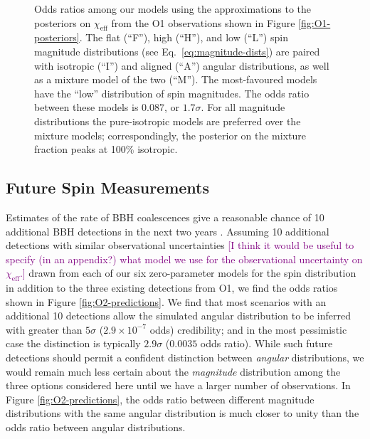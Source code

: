 \documentclass[modern,linenumbers]{aastex61}
\newcommand{\chieff}{\chi_\mathrm{eff}}
\newcommand{\OOneSigmaIsoAligned}{1.7}
\newcommand{\OOneOddsIsoAligned}{0.087}
\newcommand{\OTwoSigmaIsoAlignedMin}{2.9}
\newcommand{\OTwoOddsIsoAlignedMin}{0.0035}
\newcommand{\ilya}[1]{\textcolor{purple}{#1}}
\begin{document}
\begin{figure}
  \caption{Odds ratios among our models using the approximations to
    the posteriors on $\chieff$ from the O1 observations shown in
    Figure \ref{fig:O1-posteriors}.  The flat (``F''), high (``H''),
    and low (``L'') spin magnitude distributions (see Eq.\
    \eqref{eq:magnitude-dists}) are paired with isotropic (``I'') and
    aligned (``A'') angular distributions, as well as a mixture model
    of the two (``$\mathrm{M}$'').  The most-favoured models have the
    ``low'' distribution of spin magnitudes.  The odds ratio between
    these models is $\OOneOddsIsoAligned$, or
    $\OOneSigmaIsoAligned\sigma$.  For all magnitude distributions the
    pure-isotropic models are preferred over the mixture models;
    correspondingly, the posterior on the mixture fraction peaks at
    100\% isotropic.}
  \label{fig:O1-odds}
\end{figure}

\subsection{Future Spin Measurements}
\label{subsec:future}

Estimates of the rate of \ac{BBH} coalescences give a reasonable
chance of 10 additional \ac{BBH} detections in the next two years
\citep{O1-BBH,2016ApJ...833L...1A,2016ApJS..227...14A}.  Assuming 10
additional detections with similar observational uncertainties
\ilya{[I think it would be useful to specify (in an appendix?) what
  model we use for the observational uncertainty on $\chieff$.]}
drawn from each of our six zero-parameter models for the spin
distribution in addition to the three existing detections from
O1, we find the odds ratios shown in Figure
\ref{fig:O2-predictions}.  We find that most scenarios with an
additional 10 detections allow the simulated angular distribution to
be inferred with greater than $5\sigma$ ($2.9 \times 10^{-7}$ odds)
credibility; and in the most pessimistic case the distinction is
typically $\OTwoSigmaIsoAlignedMin\sigma$ ($\OTwoOddsIsoAlignedMin$
odds ratio).  While such future detections should permit a confident
distinction between \emph{angular} distributions, we would remain much
less certain about the \emph{magnitude} distribution among the three
options considered here until we have a larger number of observations.
In Figure \ref{fig:O2-predictions}, the odds ratio between different
magnitude distributions with the same angular distribution is much
closer to unity than the odds ratio between angular distributions.
\end{document}
